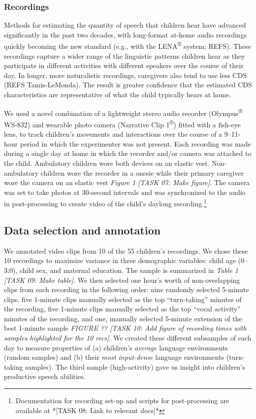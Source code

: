 \documentclass[floatsintext,man]{apa6}
\theoremstyle{definition}
\theoremstyle{definition}
\theoremstyle{definition}
\theoremstyle{remark}
\begin{document}
\subsubsection{Recordings}\label{methods-corpus-recs}

Methods for estimating the quantity of speech that children hear have
advanced significantly in the past two decades, with long-format at-home
audio recordings quickly becoming the new standard (e.g., with the
LENA\textsuperscript{®} system; REFS). These recordings capture a wider
range of the linguistic patterns children hear as they participate in
different activities with different speakers over the course of their
day. In longer, more naturalistic recordings, caregivers also tend to
use less CDS (REFS Tamis-LeMonda). The result is greater confidence that
the estimated CDS characteristics are representative of what the child
typically hears at home.

We used a novel combination of a lightweight stereo audio recorder
(Olympus\textsuperscript{®} WS-832) and wearable photo camera (Narrative
Clip 1\textsuperscript{®}) fitted with a fish-eye lens, to track
children's movements and interactions over the course of a 9--11-hour
period in which the experimenter was not present. Each recording was
made during a single day at home in which the recorder and/or camera was
attached to the child. Ambulatory children wore both devices on an
elastic vest. Non-ambulatory children wore the recorder in a onesie
while their primary caregiver wore the camera on an elastic vest
\emph{Figure 1} \emph{{[}TASK 07: Make figure{]}}. The camera was set to
take photos at 30-second intervals and was synchronized to the audio in
post-processing to create video of the child's daylong
recording.\footnote{Documentation for recording set-up and scripts for post-processing are available at *[TASK 08: Link to relevant docs]*}

\subsection{Data selection and annotation}\label{methods-samples}

We annotated video clips from 10 of the 55 children's recordings. We
chose these 10 recordings to maximize variance in three demographic
variables: child age (0--3;0), child sex, and maternal education. The
sample is summarized in \emph{Table 1} \emph{{[}TASK 09: Make table{]}}.
We then selected one hour's worth of non-overlapping clips from each
recording in the following order: nine randomly selected 5-minute clips,
five 1-minute clips manually selected as the top \enquote{turn-taking}
minutes of the recording, five 1-minute clips manually selected as the
top \enquote{vocal activity} minutes of the recording, and one, manually
selected 5-minute extension of the best 1-minute sample \emph{FIGURE ??}
\emph{{[}TASK 10: Add figure of recording times with samples highlighted
for the 10 recs{]}}. We created these different subsamples of each day
to measure properties of (a) children's \emph{average} language
environments (random samples) and (b) their \emph{most input-dense}
language environments (turn-taking samples). The third sample
(high-activity) gave us insight into children's productive speech
abilities.
\end{document}
